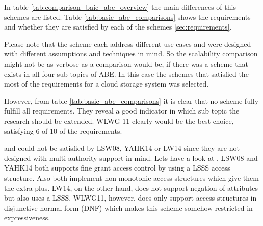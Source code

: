 In table \ref{tab:comparison_baic_abe_overview} the main differences of this schemes are listed.  Table \ref{tab:basic_abe_comparisons} shows the requirements and whether they are satisfied by each of the schemes \ref{sec:requirements}. 

Please note that the scheme each address different use cases and were designed with different assumptions and techniques in mind. So the scalability comparison might not be as verbose as a comparison would be, if there was a scheme that exists in all four sub topics of ABE. In this case the schemes that satisfied the most of the requirements for a cloud storage system was selected. 

However, from table \ref{tab:basic_abe_comparisons} it is clear that no scheme fully fulfill all requirements. They reveal a good indicator in which sub topic the research should be extended. WLWG 11 clearly would be the best choice, satisfying 6 of 10 of the requirements. 

 and  could not be satisfied by LSW08, YAHK14 or LW14 since they are not designed with multi-authority support in mind. 
Lets have a look at . LSW08 and YAHK14 both supports fine grant access control by using a \ac{LSSS} access structure. Also both implement non-monotonic access structures which give them the extra plus. LW14, on the other hand, does not support negation of attributes but also uses a LSSS. WLWG11, however, does only support access structures in disjunctive normal form
 (\ac{DNF}) which makes this scheme somehow restricted in expressiveness. 

